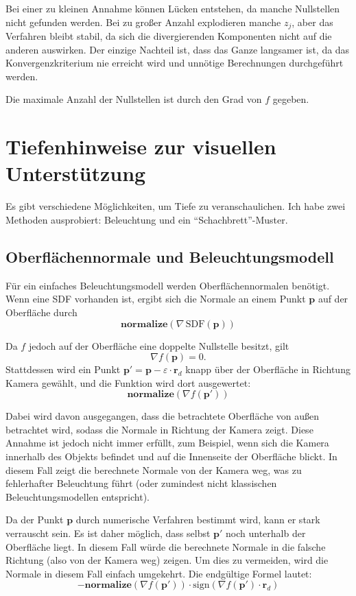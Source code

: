 \documentclass[
	ngerman,%
	accentcolor=9c,%
	ruledheaders=section,%
	class=report,%
	thesis={type=bachelor},%
	fontsize=11pt,%
	parskip=half-,%
	custommargins=true,%
	marginpar=false,%
]{tudapub}
\begin{document}
Bei einer zu kleinen Annahme können Lücken entstehen, da manche Nullstellen nicht
gefunden werden. Bei zu großer Anzahl explodieren manche \( z_j \), aber das Verfahren bleibt stabil, da sich die divergierenden Komponenten nicht auf die anderen auswirken. Der einzige Nachteil
ist, dass das Ganze langsamer ist, da das Konvergenzkriterium nie erreicht wird und unnötige Berechnungen durchgeführt werden.

Die maximale Anzahl der Nullstellen ist durch den Grad von \( f \) gegeben.

  
\section{Tiefenhinweise zur visuellen Unterstützung}
Es gibt verschiedene Möglichkeiten, um Tiefe zu veranschaulichen.  
Ich habe zwei Methoden ausprobiert: Beleuchtung und ein \enquote{Schachbrett}-Muster.
\subsection{Oberflächennormale und Beleuchtungsmodell}


Für ein einfaches Beleuchtungsmodell werden Oberflächennormalen benötigt.  
Wenn eine SDF vorhanden ist, ergibt sich die Normale an einem Punkt \( \mathbf{p} \) auf der Oberfläche durch  
\[
\mathbf{normalize}(\nabla\,\text{SDF}(\mathbf{p}))
\]  

Da \( f \) jedoch auf der Oberfläche eine doppelte Nullstelle besitzt, gilt  
\[
\nabla f(\mathbf{p}) = 0.
\]  
Stattdessen wird ein Punkt \( \mathbf{p}' = \mathbf{p} - \varepsilon \cdot \mathbf{r}_d \) knapp über der Oberfläche in Richtung Kamera gewählt, und die Funktion wird dort ausgewertet:  
\[
\mathbf{normalize}(\nabla f(\mathbf{p}'))
\]  

Dabei wird davon ausgegangen, dass die betrachtete Oberfläche von außen betrachtet wird, sodass die Normale in Richtung der Kamera zeigt. Diese Annahme ist jedoch nicht immer erfüllt, zum Beispiel, wenn sich die Kamera innerhalb des Objekts befindet und auf die Innenseite der Oberfläche blickt. In diesem Fall zeigt die berechnete Normale von der Kamera weg, was zu fehlerhafter Beleuchtung führt (oder zumindest nicht klassischen Beleuchtungsmodellen entspricht).

Da der Punkt \( \mathbf{p} \) durch numerische Verfahren bestimmt wird, kann er stark verrauscht sein. Es ist daher möglich, dass selbst \( \mathbf{p}' \) noch unterhalb der Oberfläche liegt. In diesem Fall würde die berechnete Normale in die falsche Richtung (also von der Kamera weg) zeigen.
Um dies zu vermeiden, wird die Normale in diesem Fall einfach umgekehrt.
 Die endgültige Formel lautet:
\[
- \mathbf{normalize}(\nabla f(\mathbf{p}')) \cdot \text{sign}(\nabla f(\mathbf{p}') \cdot \mathbf{r}_d)
\]
\end{document}
